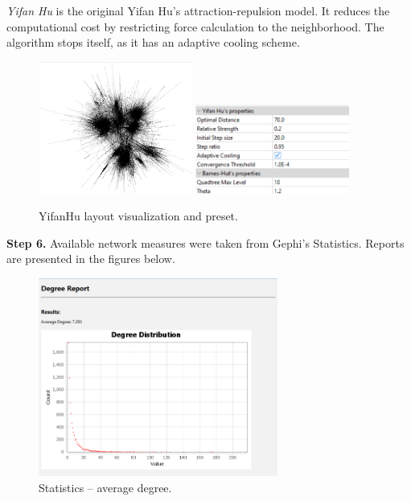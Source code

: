 \documentclass[12pt, a4paper]{article}
\begin{document}
\noindent
\textit{Yifan Hu} is the original Yifan Hu's attraction-repulsion model. It reduces the computational cost by restricting force calculation to the neighborhood. The algorithm stops itself, as it has an adaptive cooling scheme.
\begin{figure}[!h]
\centering
\includegraphics[width=0.45\textwidth]{s5p4.png}
\includegraphics[width=0.45\textwidth]{s5p5.png}
\caption{YifanHu layout visualization and preset.}
\end{figure}

\textbf{Step 6.} Available network measures were taken from Gephi's Statistics. Reports are presented in the figures below.
\begin{figure}[!h]
\centering
\includegraphics[width=0.7\textwidth]{s6p1.png}
\caption{Statistics -- average degree.}
\end{figure}

\newpage
\end{document}
